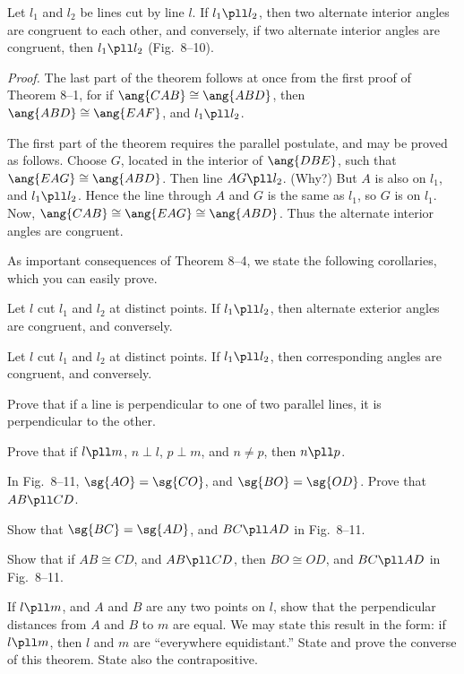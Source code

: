 \documentclass[11pt]{book}
\theoremstyle{bkplain}
\theoremstyle{XIplainnote}
\theoremstyle{bkplain}
\theoremstyle{bkplain}
\begin{document}
\FIGVIIININETEN

\begin{theorem}
Let $l_1$ and $l_2$ be lines cut by line $l$. If $l_1 \pll l_2$, then two
alternate interior angles are congruent to each other, and conversely, if two
alternate interior angles are congruent, then $l_1 \pll l_2$
\textup{(Fig.~8--10)}.
\end{theorem}

\emph{Proof.} The last part of the theorem follows at once from the first
proof of Theorem 8--1, for if $\ang{CAB} \cong \ang{ABD}$, then
$\ang{ABD} \cong \ang{EAF}$, and $l_1 \pll l_2$.

The first part of the theorem requires the parallel postulate, and may be
proved as follows. Choose $G$, located in the interior of $\ang{DBE}$, such
that $\ang{EAG} \cong \ang{ABD}$. Then line $AG \pll l_2$. (Why?) But $A$ is
also on $l_1$, and $l_1 \pll l_2$. Hence the line through $A$ and $G$ is the
same as $l_1$, so $G$ is on $l_1$. Now,
$\ang{CAB} \cong \ang{EAG} \cong \ang{ABD}$. Thus the alternate interior
angles are congruent.

As important consequences of Theorem 8--4, we state the following corollaries,
which you can easily prove.

\begin{corollary}
Let $l$ cut $l_1$ and $l_2$ at distinct points. If $l_1 \pll l_2$, then
alternate exterior angles are congruent, and conversely.
\end{corollary}

\begin{corollary}
Let $l$ cut $l_1$ and $l_2$ at distinct points. If $l_1 \pll l_2$, then
corresponding angles are congruent, and conversely.
\end{corollary}

\begin{exercisecols}
\begin{exlist}
\item Prove that if a line is perpendicular to one of two parallel lines, it
  is perpendicular to the other.
\item Prove that if $l \pll m$, $n \perp l$, $p \perp m$, and $n \neq p$, then
  $n \pll p$.
\item In Fig.~8--11, $\sg{AO} = \sg{CO}$, and $\sg{BO} = \sg{OD}$. Prove that
  $AB \pll CD$.
\exfig{\FIGVIIIELEVEN}
\item Show that $\sg{BC} = \sg{AD}$, and $BC \pll AD$ in Fig.~8--11.
\item Show that if $AB \cong CD$, and $AB \pll CD$, then $BO \cong OD$, and
  $BC \pll AD$ in Fig.~8--11.
\item If $l \pll m$, and $A$ and $B$ are any two points on $l$, show that the
  perpendicular distances from $A$ and $B$ to $m$ are equal. We may state this
  result in the form: if $l \pll m$, then $l$ and $m$ are ``everywhere
  equidistant.'' State and prove the converse of this theorem. State also the
  contrapositive.
\end{exlist}
\end{exercisecols}
\end{document}
